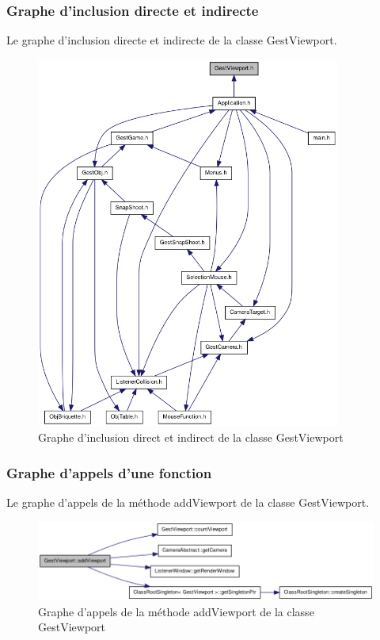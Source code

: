\documentclass[frenchb,twoside]{EPURapport}
\begin{document}
\newpage
			
			\subsubsection{Graphe d'inclusion directe et indirecte}
			Le graphe d'inclusion directe et indirecte de la classe GestViewport.
			\begin{figure}[h]
				\centering
				\includegraphics[width=10cm]{images/graph_inclusion_gestviewport.png}
				\caption{\label{fig:graph_inclusion_gestviewport}Graphe d'inclusion direct et indirect de la classe GestViewport}
			\end{figure}
			
			
			\subsubsection{Graphe d'appels d'une fonction}
			Le graphe d'appels de la méthode addViewport de la classe GestViewport.
			\begin{figure}[h]
				\centering
				\includegraphics[width=15cm]{images/graph_appels_addviewport_gestviewport.png}
				\caption{\label{fig:graph_appels_addviewport_gestviewport}Graphe d'appels de la méthode addViewport de la classe GestViewport}
			\end{figure}
    
\end{document}
